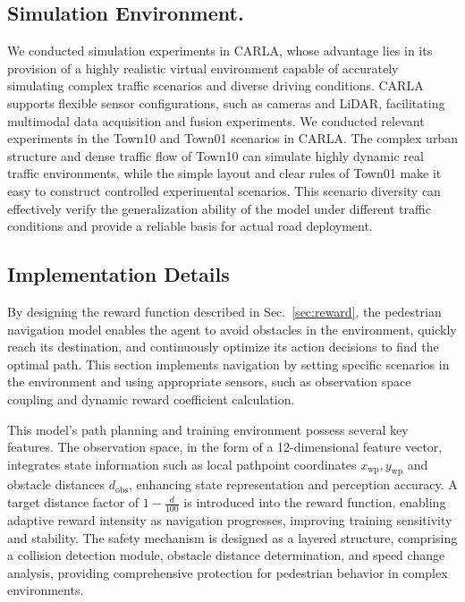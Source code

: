\documentclass[lettersize,journal]{IEEEtran}
\begin{document}
\subsection{Simulation Environment.}

We conducted simulation experiments in CARLA, whose advantage lies in its provision of a highly realistic virtual environment capable of accurately simulating complex traffic scenarios and diverse driving conditions. 
CARLA supports flexible sensor configurations, such as cameras and LiDAR, facilitating multimodal data acquisition and fusion experiments\cite{Alpher22e}. 
We conducted relevant experiments in the Town10 and Town01 scenarios in CARLA.
The complex urban structure and dense traffic flow of Town10 can simulate highly dynamic real traffic environments, while the simple layout and clear rules of Town01 make it easy to construct controlled experimental scenarios.
This scenario diversity can effectively verify the generalization ability of the model under different traffic conditions and provide a reliable basis for actual road deployment.

\subsection{Implementation Details}


By designing the reward function described in Sec.~\ref{sec:reward}, the pedestrian navigation model enables the agent to avoid obstacles in the environment, quickly reach its destination, and continuously optimize its action decisions to find the optimal path. 
This section implements navigation by setting specific scenarios in the environment and using appropriate sensors, such as observation space coupling and dynamic reward coefficient calculation.


This model's path planning and training environment possess several key features. 
The observation space, in the form of a 12-dimensional feature vector, integrates state information such as local pathpoint coordinates \(x_{\text{wp}}, y_{\text{wp}}\) and obstacle distances \(d_{\text{obs}}\), enhancing state representation and perception accuracy. 
A target distance factor of \(1 - \frac{d}{100}\) is introduced into the reward function, enabling adaptive reward intensity as navigation progresses, improving training sensitivity and stability. 
The safety mechanism is designed as a layered structure, comprising a collision detection module, obstacle distance determination, and speed change analysis, providing comprehensive protection for pedestrian behavior in complex environments. 
\end{document}
